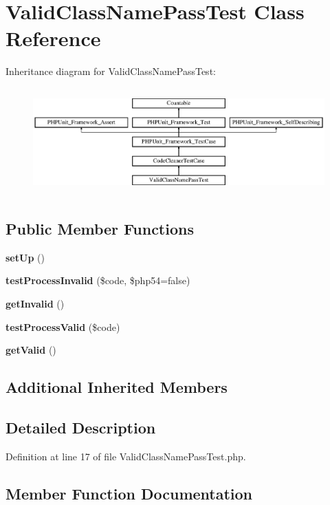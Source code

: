 \section{Valid\+Class\+Name\+Pass\+Test Class Reference}
\label{class_psy_1_1_test_1_1_code_cleaner_1_1_valid_class_name_pass_test}
Inheritance diagram for Valid\+Class\+Name\+Pass\+Test\+:\begin{figure}[H]
\begin{center}
\leavevmode
\includegraphics[height=4.129793cm]{class_psy_1_1_test_1_1_code_cleaner_1_1_valid_class_name_pass_test}
\end{center}
\end{figure}
\subsection*{Public Member Functions}
\begin{DoxyCompactItemize}
\item 
{\bf set\+Up} ()
\item 
{\bf test\+Process\+Invalid} (\$code, \$php54=false)
\item 
{\bf get\+Invalid} ()
\item 
{\bf test\+Process\+Valid} (\$code)
\item 
{\bf get\+Valid} ()
\end{DoxyCompactItemize}
\subsection*{Additional Inherited Members}


\subsection{Detailed Description}


Definition at line 17 of file Valid\+Class\+Name\+Pass\+Test.\+php.



\subsection{Member Function Documentation}
